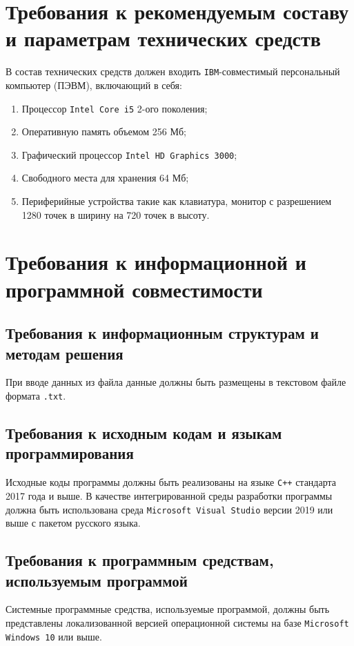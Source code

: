 \documentclass[14pt,a4paper,final]{extreport}
\begin{document}
\section{Требования к рекомендуемым составу и параметрам технических средств}
В состав технических средств должен входить \texttt{IBM}-совместимый персональный компьютер
(ПЭВМ), включающий в себя:
\begin{enumerate}[label=\asbuk*),ref=\asbuk*]
	\item Процессор \texttt{Intel Core i5} 2-ого поколения;
	\item Оперативную память объемом 256 Мб;
	\item Графический процессор \texttt{Intel HD Graphics 3000};
	\item Свободного места для хранения 64 Мб;
	\item Периферийные устройства такие как клавиатура, монитор с разрешением 1280 точек в ширину на 720 точек в высоту.
\end{enumerate}

\section{Требования к информационной и программной совместимости}

\subsection{Требования к информационным структурам и методам решения}
При вводе данных из файла данные должны быть размещены в текстовом файле формата \texttt{.txt}.

\subsection{Требования к исходным кодам и языкам программирования}
Исходные коды программы должны быть реализованы на языке \texttt{C++} стандарта 2017 года и выше. В качестве интегрированной среды разработки программы должна быть использована среда \texttt{Microsoft Visual Studio} версии 2019 или выше с пакетом русского языка.

\subsection{Требования к программным средствам, используемым программой}
Системные программные средства, используемые программой, должны быть представлены локализованной версией операционной системы на базе
\texttt{Microsoft Windows 10} или выше.
\end{document}
